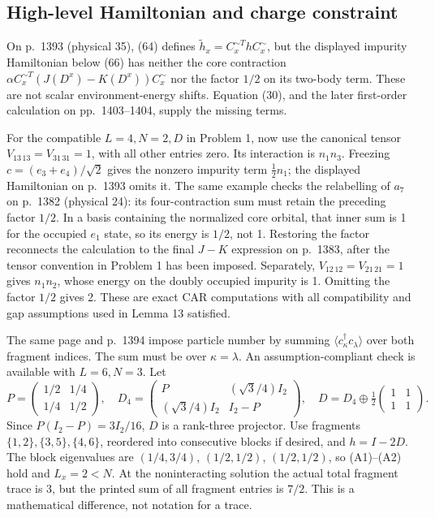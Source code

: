 \documentclass[10pt]{article}
\begin{document}
\subsection*{High-level Hamiltonian and charge constraint}
On p. 1393 (physical 35), (64) defines \(\widetilde h_x=C_x^{\sim T}hC_x^\sim\), but the displayed impurity Hamiltonian below (66) has neither the core contraction \(\alpha C_x^{\sim T}(J(D^x)-K(D^x))C_x^\sim\) nor the factor \(1/2\) on its two-body term. These are not scalar environment-energy shifts. Equation (30), and the later first-order calculation on pp. 1403–1404, supply the missing terms.\par
For the compatible \(L=4,N=2,D\) in Problem 1, now use the canonical tensor \(V_{13\,13}=V_{31\,31}=1\), with all other entries zero. Its interaction is \(n_1n_3\). Freezing \(c=(e_3+e_4)/\sqrt2\) gives the nonzero impurity term \(\frac12 n_1\); the displayed Hamiltonian on p. 1393 omits it. The same example checks the relabelling of \(a_7\) on p. 1382 (physical 24): its four-contraction sum must retain the preceding factor \(1/2\). In a basis containing the normalized core orbital, that inner sum is 1 for the occupied \(e_1\) state, so its energy is \(1/2\), not 1. Restoring the factor reconnects the calculation to the final \(J-K\) expression on p. 1383, after the tensor convention in Problem 1 has been imposed. Separately, \(V_{12\,12}=V_{21\,21}=1\) gives \(n_1n_2\), whose energy on the doubly occupied impurity is 1. Omitting the factor \(1/2\) gives 2. These are exact CAR computations with all compatibility and gap assumptions used in Lemma 13 satisfied.\par
The same page and p. 1394 impose particle number by summing \(\langle c_\kappa^\dagger c_\lambda\rangle\) over both fragment indices. The sum must be over \(\kappa=\lambda\). An assumption-compliant check is available with \(L=6,N=3\). Let \[P=\begin{pmatrix}1/2&1/4\\1/4&1/2\end{pmatrix},\quad
 D_4=\begin{pmatrix}P&(\sqrt3/4)I_2\\
                    (\sqrt3/4)I_2&I_2-P\end{pmatrix},\quad
 D=D_4\oplus\tfrac12\begin{pmatrix}1&1\\1&1\end{pmatrix}.\] Since \(P(I_2-P)=3I_2/16\), \(D\) is a rank-three projector. Use fragments \(\{1,2\},\{3,5\},\{4,6\}\), reordered into consecutive blocks if desired, and \(h=I-2D\). The block eigenvalues are \((1/4,3/4)\), \((1/2,1/2)\), \((1/2,1/2)\), so (A1)–(A2) hold and \(L_x=2<N\). At the noninteracting solution the actual total fragment trace is 3, but the printed sum of all fragment entries is \(7/2\). This is a mathematical difference, not notation for a trace.\par
\end{document}
